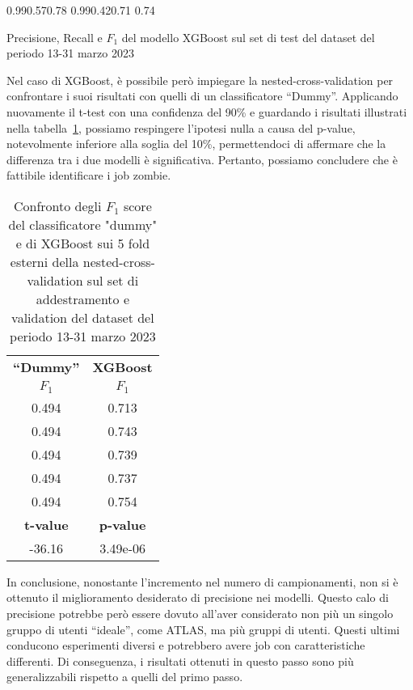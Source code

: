 \begin{table}[!ht]
    \centering 
    \scores%
    {0.99}{0.57}{0.78}%
    {0.99}{0.42}{0.71}%
    {0.74} 
    \caption{\small Precisione, Recall e $F_1$ del modello XGBoost sul set di
    test del dataset del periodo 13-31 marzo 2023}
    \label{table:scores_xgboost_mar2023}
\end{table}

Nel caso di XGBoost, è possibile però impiegare la nested-cross-validation per
confrontare i suoi risultati con quelli di un classificatore ``Dummy''.
Applicando nuovamente il t-test con una confidenza del 90\% e guardando i
risultati illustrati nella tabella~\ref{table:nested_cv_f1_scores_mar2023},
possiamo respingere l'ipotesi nulla a causa del p-value, notevolmente
inferiore alla soglia del 10\%, permettendoci di affermare che la differenza
tra i due modelli è significativa. Pertanto, possiamo concludere che è
fattibile identificare i job zombie.

\begin{table}[!ht]
    \centering
    \begin{tabular}{cc}
        \toprule
        \textbf{``Dummy''} & \textbf{XGBoost} \\  
        $F_1$ & $F_1$ \\ 
        \midrule
        0.494 & 0.713 \\
        0.494 & 0.743 \\
        0.494 & 0.739 \\
        0.494 & 0.737 \\
        0.494 & 0.754 \\
        \midrule 
        \textbf{t-value} & \textbf{p-value} \\ 
        \midrule
        -36.16 & 3.49e-06 \\
        \bottomrule
    \end{tabular}
    \caption{\small Confronto degli $F_1$ score del classificatore "dummy" e
    di XGBoost sui 5 fold esterni della nested-cross-validation sul set di
addestramento e validation del dataset del periodo 13-31 marzo 2023}
    \label{table:nested_cv_f1_scores_mar2023}
\end{table}

In conclusione, nonostante l'incremento nel numero di campionamenti, non si è
ottenuto il miglioramento desiderato di precisione nei modelli. Questo calo di
precisione potrebbe però essere dovuto all'aver considerato non più un singolo
gruppo di utenti ``ideale'', come ATLAS, ma più gruppi di utenti. Questi
ultimi conducono esperimenti diversi e potrebbero avere job con
caratteristiche differenti. Di conseguenza, i risultati ottenuti in questo
passo sono più generalizzabili rispetto a quelli del primo passo.

